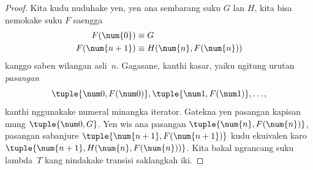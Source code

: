 \documentclass[../../../include/open-logic-section]{subfiles}
\begin{document}
\begin{proof}
Kita kudu nuduhake yen, yen ana
sembarang suku $G$ lan $H$, kita bisa
nemokake suku $F$ saengga
\begin{align*}
F(\num{0}) & \equiv G \\
F(\num{n+1}) & \equiv H(\num{n}, F(\num{n}))
\end{align*}
kanggo saben wilangan asli~$n$.
Gagasane, kanthi kasar, yaiku ngitung
urutan \emph{pasangan}
\[
\tuple{\num 0, F(\num 0)}, \tuple{\num 1, F(\num 1)}, \dots,
\]
kanthi nggunakake numeral minangka iterator.
Gatekna yen pasangan kapisan mung
$\tuple{\num 0, G}$. Yen wis ana pasangan
$\tuple{\num{n}, F(\num{n})}$, pasangan
sabanjure $\tuple{\num{n+1}, F(\num{n+1})}$
kudu ekuivalen karo
$\tuple{\num{n+1}, H(\num{n}, F(\num{n}))}$.
Kita bakal ngrancang suku lambda~$T$
kang nindakake transisi saklangkah iki.


\end{proof}
\end{document}
